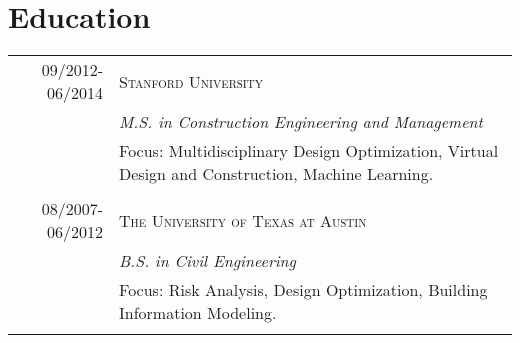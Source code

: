 \documentclass[a4paper,10pt]{article}
\begin{document}
\begin{tabularx}{\textwidth}{r|X}


\end{tabularx}




\section{Education}
\begin{tabularx}{\textwidth}{r|X}	
 \textsc{09/2012-06/2014} & \textsc{Stanford University} \\ 
& \emph{M.S. in Construction Engineering and Management} \\&\footnotesize{Focus: Multidisciplinary Design Optimization, Virtual Design and Construction, Machine Learning.}\\\multicolumn{2}{c}{} \\

\textsc{08/2007-06/2012} & \textsc{The University of Texas at Austin}\\
& \emph{B.S. in Civil Engineering} \\&\footnotesize{Focus: Risk Analysis, Design Optimization, Building Information Modeling.}\\\multicolumn{2}{c}{} \\
\end{tabularx}













\end{document}
